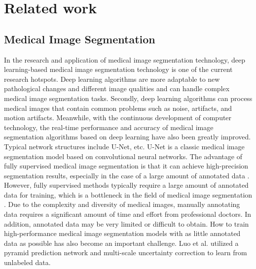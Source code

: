 \documentclass[sigconf,natbib=false]{acmart}
\begin{document}
\section{Related work}

\subsection{Medical Image Segmentation}
In the research and application of medical image segmentation technology\cite{hong2023distance}\cite{shan2023coarse}\cite{xu2022mrdff}, deep learning-based medical image segmentation technology is one of the current research hotspots. Deep learning algorithms are more adaptable to new pathological changes and different image qualities and can handle complex medical image segmentation tasks. Secondly, deep learning algorithms \cite{ronneberger2015u}\cite{milletari2016v}\cite{isensee2021nnu}\cite{luo2022semi} can process medical images that contain common problems such as noise, artifacts, and motion artifacts. Meanwhile, with the continuous development of computer technology, the real-time performance and accuracy of medical image segmentation algorithms based on deep learning have also been greatly improved.  
Typical network structures include U-Net\cite{ronneberger2015u}, etc. U-Net is a classic medical image segmentation model based on convolutional neural networks. The advantage of fully supervised medical image segmentation is that it can achieve high-precision segmentation results, especially in the case of a large amount of annotated data \cite{kirillov2023segment}\cite{qiu2023cor}. However, fully supervised methods typically require a large amount of annotated data for training, which is a bottleneck in the field of medical image segmentation \cite{wang2023SwinMM}. Due to the complexity and diversity of medical images, manually annotating data requires a significant amount of time and effort from professional doctors. In addition, annotated data may be very limited or difficult to obtain. How to train high-performance medical image segmentation models with as little annotated data as possible has also become an important challenge. Luo et al.\cite{luo2021urpc} utilized a pyramid prediction network and multi-scale uncertainty correction to learn from unlabeled data. 
\vspace{-4mm}
\end{document}
